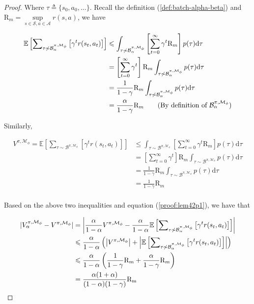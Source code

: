 \begin{proof}
Where $\tau\triangleq\{s_0,a_0,\ldots\}$. Recall the definition (\ref{def:batch-alpha-beta}) and  $\mathrm{R}_{m}=\underset{s\in\mathcal{S},a\in\mathcal{A}}{\sup}r(s,a)$, we have

\begin{align*}
\mathbb{E}\left[{\sum}_{\tau \not\sim\mathcal{B}_\alpha^{\pi,\mathcal{M}_\phi}}\left[\gamma^t r(s_t,a_t)\right]\right] &\leq\int_{\tau\not\sim{\mathcal{B}_\alpha^{\pi,\mathcal{M}_\phi}}}\left[\sum_{t=0}^\infty\gamma^t \mathrm{R}_m\right]p(\tau)\mathrm{d}\tau\\
&=\left[\sum_{t=0}^\infty\gamma^t\right]\mathrm{R}_m\int_{\tau\not\sim{\mathcal{B}_\alpha^{\pi,\mathcal{M}_\phi}}}p(\tau)\mathrm{d}\tau\\
&= \frac{1}{1-\gamma}\mathrm{R}_m \int_{\tau\not\sim{\mathcal{B}_\alpha^{\pi,\mathcal{M}_\phi}}}p(\tau)\mathrm{d}\tau\\
&=\frac{\alpha}{1-\gamma}\mathrm{R}_m \tag{By definition of $\mathcal{B}_\alpha^{\pi,\mathcal{M}_\phi}$}\\
\end{align*}

Similarly,

\begin{align*}
V^{\pi,\mathcal{M}_\phi} = \mathbb{E}\left[{\sum}_{\tau \sim\mathcal{B}^{\pi,\mathcal{M}_\phi}}\left[\gamma^t r(s_t,a_t)\right]\right] &\leq\int_{\tau \sim\mathcal{B}^{\pi,\mathcal{M}_\phi}}\left[\sum_{t=0}^\infty\gamma^t \mathrm{R}_m\right]p(\tau)\mathrm{d}\tau\\
&=\left[\sum_{t=0}^\infty\gamma^t\right]\mathrm{R}_m\int_{\tau \sim\mathcal{B}^{\pi,\mathcal{M}_\phi}}p(\tau)\mathrm{d}\tau\\
&= \frac{1}{1-\gamma}\mathrm{R}_m \int_{\tau \sim\mathcal{B}^{\pi,\mathcal{M}_\phi}}p(\tau)\mathrm{d}\tau\\
&=\frac{1}{1-\gamma}\mathrm{R}_m\\
\end{align*}

Based on the above two inequalities and equation (\ref{proof:lem42p1}), we have that

\begin{align}
|{V}_\alpha^{\pi, \mathcal{M}_{\phi}} - {V}^{\pi,\mathcal{M}_{\phi}}| &=  \left|\frac{\alpha}{1-\alpha}V^{\pi,\mathcal{M}_\phi}-\frac{\alpha}{1-\alpha}\mathbb{E}\left[{\sum}_{\tau \not\sim\mathcal{B}_\alpha^{\pi,\mathcal{M}_\phi}}\left[\gamma^t r(s_t,a_t)\right]\right]\right| \notag\\
&\leq\frac{\alpha}{1-\alpha}\left(\left|V^{\pi,\mathcal{M}_\phi}\right|+\left|\mathbb{E}\left[{\sum}_{\tau \not\sim\mathcal{B}_\alpha^{\pi,\mathcal{M}_\phi}}\left[\gamma^t r(s_t,a_t)\right]\right]\right|\right)\notag\\
&\leq \frac{\alpha}{1-\alpha}\left(\frac{1}{1-\gamma}\mathrm{R}_m+\frac{\alpha}{1-\gamma}\mathrm{R}_m\right) \notag\\
&=\frac{\alpha(1+\alpha)}{(1-\alpha)(1-\gamma)}\mathrm{R_{m}} \label{eq:lem42}
\end{align}

\end{proof}



